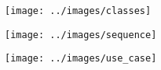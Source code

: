 
\texttt{[image: ../images/classes]}
\clearpage

\texttt{[image: ../images/sequence]}
\clearpage

\texttt{[image: ../images/use\_case]}
\clearpage
